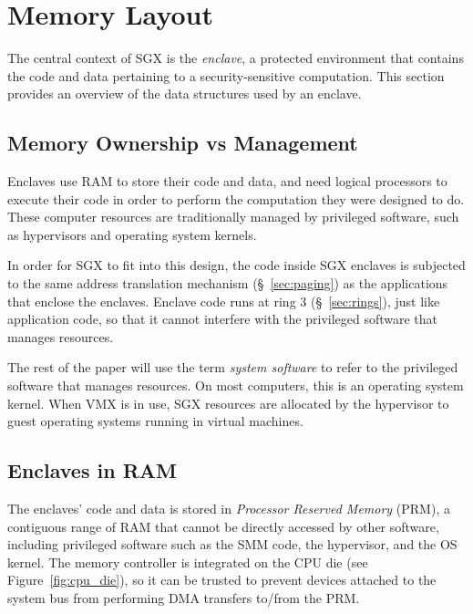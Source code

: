 \section{Memory Layout}
\label{sec:enclaves}

The central context of SGX is the \textit{enclave}, a protected environment
that contains the code and data pertaining to a security-sensitive computation.
This section provides an overview of the data structures used by an enclave.


\subsection{Memory Ownership vs Management}


Enclaves use RAM to store their code and data, and need logical processors to
execute their code in order to perform the computation they were designed to
do. These computer resources are traditionally managed by privileged software,
such as hypervisors and operating system kernels.

In order for SGX to fit into this design, the code inside SGX enclaves is
subjected to the same address translation mechanism (\S~\ref{sec:paging}) as
the applications that enclose the enclaves. Enclave code runs at ring 3
(\S~\ref{sec:rings}), just like application code, so that it cannot
interfere with the privileged software that manages resources.


The rest of the paper will use the term \textit{system software} to refer to
the privileged software that manages resources. On most computers, this is an
operating system kernel. When VMX is in use, SGX resources are allocated by
the hypervisor to guest operating systems running in virtual machines.


\subsection{Enclaves in RAM}


The enclaves' code and data is stored in \textit{Processor Reserved Memory}
(PRM), a contiguous range of RAM that cannot be directly accessed by other
software, including privileged software such as the SMM code, the hypervisor,
and the OS kernel. The memory controller is integrated on the CPU die (see
Figure~\ref{fig:cpu_die}), so it can be trusted to prevent devices attached to
the system bus from performing DMA transfers to/from the PRM.

